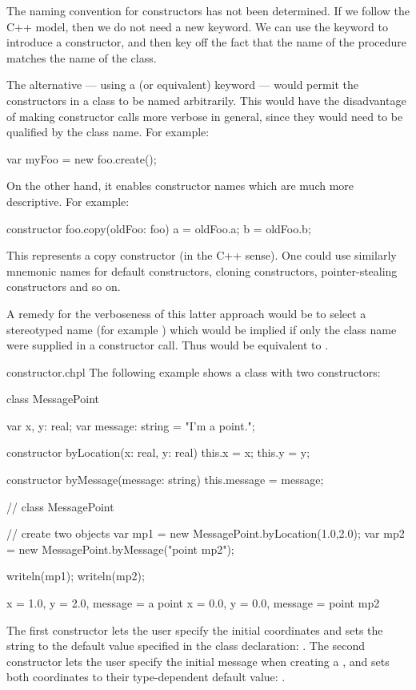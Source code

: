 \begin{openissue}
The naming convention for constructors has not been determined.  If we follow
the C++ model, then we do not need a new keyword.  We can use the 
keyword to introduce a constructor, and then key off the fact that the name of
the procedure matches the name of the class.

The alternative --- using a  (or equivalent) keyword --- would
permit the constructors in a class to be named arbitrarily.  This would have the
disadvantage of making constructor calls more verbose in general, since they
would need to be qualified by the class name.  For example:
\begin{chapel}
var myFoo = new foo.create();
\end{chapel}
On the other hand, it enables constructor names which are much more
descriptive.  For example:
\begin{chapel}
constructor foo.copy(oldFoo: foo) 
{ a = oldFoo.a; b = oldFoo.b; }
{ }
\end{chapel}
This represents a copy constructor (in the C++ sense).  One could use similarly
mnemonic names for default constructors, cloning constructors, pointer-stealing constructors and so
on.  

A remedy for the verboseness of this latter approach would be to select a
stereotyped name (for example ) which would be implied if only
the class name were supplied in a constructor call.  Thus  would be equivalent to  .
\end{openissue}

\begin{chapelexample}{constructor.chpl}
The following example shows a class with two constructors:
\begin{chapel}
class MessagePoint {
  var x, y: real;
  var message: string = "I'm a point.";

  constructor byLocation(x: real, y: real) 
  { this.x = x; this.y = y; }
  {} 

  constructor byMessage(message: string) 
  { this.message = message; }
  {}
}  // class MessagePoint

// create two objects
var mp1 = new MessagePoint.byLocation(1.0,2.0);
var mp2 = new MessagePoint.byMessage("point mp2");
\end{chapel}
\begin{chapelpost}
writeln(mp1);
writeln(mp2);
\end{chapelpost}
\begin{chapeloutput}
{x = 1.0, y = 2.0, message = a point}
{x = 0.0, y = 0.0, message = point mp2}
\end{chapeloutput}
The first constructor lets the user specify the initial coordinates
and sets the string to the default value specified in the class
declaration: .  The second constructor lets the user specify the initial message
when creating a , and sets both coordinates to their
type-dependent default value: .
\end{chapelexample}

